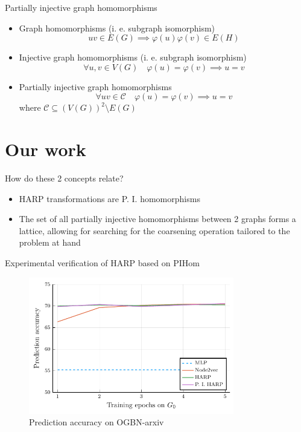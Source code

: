 \documentclass[10pt]{beamer}
\begin{document}
\begin{frame}{Partially injective graph homomorphisms}
	\begin{itemize}
		\item Graph homomorphisms (i. e. subgraph isomorphism)
\[ uv \in E \left( G \right) \implies \varphi \left( u \right) \varphi \left( v \right) \in E \left( H \right) \]
		\item Injective graph homomorphisms (i. e. subgraph isomorphism)
\[ \forall u, v \in V \left( G \right) \quad \varphi \left( u \right) = \varphi \left( v \right) \implies u = v \]
		\item Partially injective graph homomorphisms
\[ \forall uv \in \mathcal{C} \quad \varphi \left( u \right) = \varphi \left( v \right) \implies u = v \]
			where \( \mathcal{C} \subseteq \left( V \left( G \right) \right)^2 \setminus E \left( G \right) \)
	\end{itemize}
\end{frame}

\section{Our work}

\begin{frame}{How do these 2 concepts relate?}
	\begin{itemize}
		\item HARP transformations are P. I. homomorphisms
		\item The set of all partially injective homomorphisms between 2 graphs forms a lattice, allowing for searching for the coarsening operation tailored to the problem at hand
	\end{itemize}
\end{frame}

\begin{frame}{Experimental verification of HARP based on PIHom}
	\begin{figure}
		\centering
		\includegraphics[width=0.8\textwidth]{images/pihom_comparison/pihom_comparison.pdf}
		\caption{Prediction accuracy on OGBN-arxiv}
	\end{figure}
\end{frame}
\end{document}
